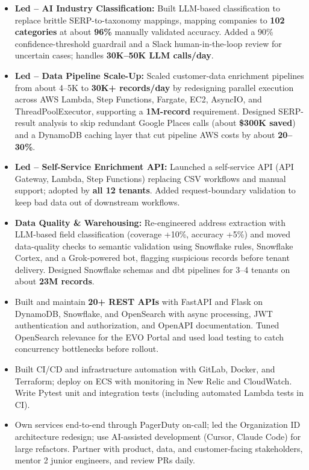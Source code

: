 \documentclass[10pt]{article}
\begin{document}
\begin{itemize}
\item \textbf{Led -- AI Industry Classification:} Built LLM-based classification to replace brittle SERP-to-taxonomy mappings, mapping companies to \textbf{102 categories} at about \textbf{96\%} manually validated accuracy. Added a 90\% confidence-threshold guardrail and a Slack human-in-the-loop review for uncertain cases; handles \textbf{30K--50K LLM calls/day}.
\item \textbf{Led -- Data Pipeline Scale-Up:} Scaled customer-data enrichment pipelines from about 4--5K to \textbf{30K+ records/day} by redesigning parallel execution across AWS Lambda, Step Functions, Fargate, EC2, AsyncIO, and ThreadPoolExecutor, supporting a \textbf{1M-record} requirement. Designed SERP-result analysis to skip redundant Google Places calls (about \textbf{\$300K saved}) and a DynamoDB caching layer that cut pipeline AWS costs by about \textbf{20--30\%}.
\item \textbf{Led -- Self-Service Enrichment API:} Launched a self-service API (API Gateway, Lambda, Step Functions) replacing CSV workflows and manual support; adopted by \textbf{all 12 tenants}. Added request-boundary validation to keep bad data out of downstream workflows.
\item \textbf{Data Quality \& Warehousing:} Re-engineered address extraction with LLM-based field classification (coverage +10\%, accuracy +5\%) and moved data-quality checks to semantic validation using Snowflake rules, Snowflake Cortex, and a Grok-powered bot, flagging suspicious records before tenant delivery. Designed Snowflake schemas and dbt pipelines for 3--4 tenants on about \textbf{23M records}.
\item Built and maintain \textbf{20+ REST APIs} with FastAPI and Flask on DynamoDB, Snowflake, and OpenSearch with async processing, JWT authentication and authorization, and OpenAPI documentation. Tuned OpenSearch relevance for the EVO Portal and used load testing to catch concurrency bottlenecks before rollout.
\item Built CI/CD and infrastructure automation with GitLab, Docker, and Terraform; deploy on ECS with monitoring in New Relic and CloudWatch. Write Pytest unit and integration tests (including automated Lambda tests in CI).
\item Own services end-to-end through PagerDuty on-call; led the Organization ID architecture redesign; use AI-assisted development (Cursor, Claude Code) for large refactors. Partner with product, data, and customer-facing stakeholders, mentor 2 junior engineers, and review PRs daily.
\end{itemize}
\end{document}
